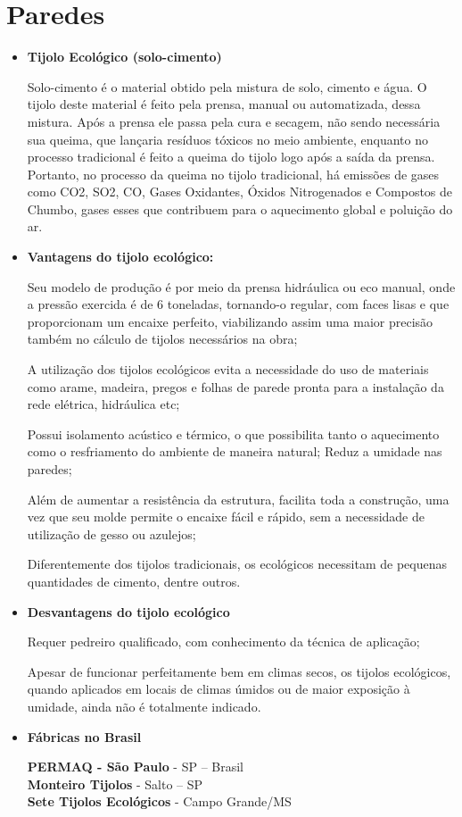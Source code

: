\section{Paredes}
\begin{itemize}

\item \textbf{Tijolo Ecológico (solo-cimento)}

	Solo-cimento é o material obtido pela mistura de solo, cimento e água. O tijolo deste material é feito pela prensa, manual ou automatizada, dessa mistura. Após a prensa ele passa pela cura e secagem, não sendo necessária sua queima, que lançaria resíduos tóxicos no meio ambiente, enquanto no processo tradicional é feito a queima do tijolo logo após a saída da prensa. Portanto, no processo da queima no tijolo tradicional, há emissões de gases como CO2, SO2, CO, Gases Oxidantes, Óxidos Nitrogenados e Compostos de Chumbo, gases esses que contribuem para o aquecimento global e poluição do ar.\cite{Castro2011}

\item \textbf{Vantagens do tijolo ecológico:}

	Seu modelo de produção é por meio da prensa hidráulica ou eco manual, onde a pressão exercida é de 6 toneladas, tornando-o regular, com faces lisas e que proporcionam um encaixe perfeito, viabilizando assim uma maior precisão também no cálculo de tijolos necessários na obra;

	A utilização dos tijolos ecológicos evita a necessidade do uso de materiais como arame, madeira, pregos e folhas de parede pronta para a instalação da rede elétrica, hidráulica etc;

	Possui isolamento acústico e térmico, o que possibilita tanto o aquecimento como o resfriamento do ambiente de maneira natural;
Reduz a umidade nas paredes;
	
	Além de aumentar a resistência da estrutura, facilita toda a construção, uma vez que seu molde permite o encaixe fácil e rápido, sem a necessidade de utilização de gesso ou azulejos;
	
	Diferentemente dos tijolos tradicionais, os ecológicos necessitam de pequenas quantidades de cimento, dentre outros.

\item \textbf{Desvantagens do tijolo ecológico}

	Requer pedreiro qualificado, com conhecimento da técnica de aplicação;

	Apesar de funcionar perfeitamente bem em climas secos, os tijolos ecológicos, quando aplicados em locais de climas úmidos ou de maior exposição à umidade, ainda não é totalmente indicado.

\item \textbf{Fábricas no Brasil}

\textbf{PERMAQ - São Paulo} - SP – Brasil\\
\textbf{Monteiro Tijolos} - Salto – SP\\
\textbf{Sete Tijolos Ecológicos} - Campo Grande/MS

\end{itemize}

